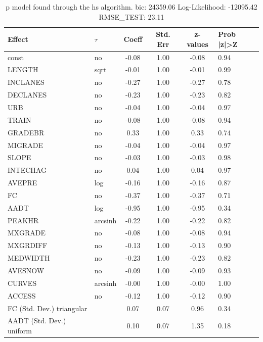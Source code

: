 \begin{table}
	\caption{p model found through the hs algorithm. bic: 24359.06 Log-Likelihood: -12095.42 RMSE_TEST: 23.11}
	\begin{center}
		\begin{tabular}{|l|l|c|c|c|l|}
			\hline
			Effect & $\tau$ & Coeff & Std. Err & z-values & Prob |z|>Z \\
			\hline
			const & no & -0.08 & 1.00 & -0.08 & 0.94 \\
			\hline
			LENGTH & sqrt & -0.01 & 1.00 & -0.01 & 0.99 \\
			\hline
			INCLANES & no & -0.27 & 1.00 & -0.27 & 0.78 \\
			\hline
			DECLANES & no & -0.23 & 1.00 & -0.23 & 0.82 \\
			\hline
			URB & no & -0.04 & 1.00 & -0.04 & 0.97 \\
			\hline
			TRAIN & no & -0.08 & 1.00 & -0.08 & 0.94 \\
			\hline
			GRADEBR & no & 0.33 & 1.00 & 0.33 & 0.74 \\
			\hline
			MIGRADE & no & -0.04 & 1.00 & -0.04 & 0.97 \\
			\hline
			SLOPE & no & -0.03 & 1.00 & -0.03 & 0.98 \\
			\hline
			INTECHAG & no & 0.04 & 1.00 & 0.04 & 0.97 \\
			\hline
			AVEPRE & log & -0.16 & 1.00 & -0.16 & 0.87 \\
			\hline
			FC & no & -0.37 & 1.00 & -0.37 & 0.71 \\
			\hline
			AADT & log & -0.95 & 1.00 & -0.95 & 0.34 \\
			\hline
			PEAKHR & arcsinh & -0.22 & 1.00 & -0.22 & 0.82 \\
			\hline
			MXGRADE & no & -0.08 & 1.00 & -0.08 & 0.94 \\
			\hline
			MXGRDIFF & no & -0.13 & 1.00 & -0.13 & 0.90 \\
			\hline
			MEDWIDTH & no & -0.23 & 1.00 & -0.23 & 0.82 \\
			\hline
			AVESNOW & no & -0.09 & 1.00 & -0.09 & 0.93 \\
			\hline
			CURVES & arcsinh & -0.00 & 1.00 & -0.00 & 1.00 \\
			\hline
			ACCESS & no & -0.12 & 1.00 & -0.12 & 0.90 \\
			\hline
			FC (Std. Dev.) triangular &  & 0.07 & 0.07 & 0.96 & 0.34 \\
			\hline
			AADT (Std. Dev.) uniform &  & 0.10 & 0.07 & 1.35 & 0.18 \\

\end{tabular}
\end{center}
\end{table}
